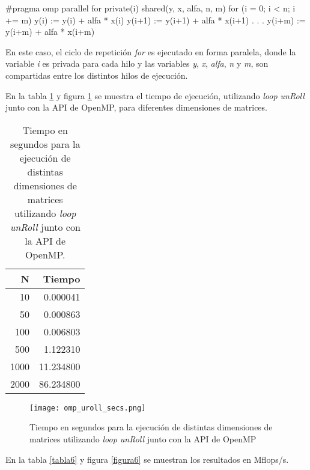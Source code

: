 \documentclass[a4paper,11pt]{article}
\begin{document}
\begin{verbatimtab}

#pragma omp parallel for private(i) shared(y, x, alfa, n, m)
for (i = 0; i < n; i += m)
{
	y(i) := y(i) + alfa * x(i)
	y(i+1) := y(i+1) + alfa * x(i+1)
		.
		.
		.
	y(i+m) := y(i+m) + alfa * x(i+m)
}
\end{verbatimtab}

En este caso, el ciclo de repetici\'on \emph{for} es ejecutado en forma paralela, donde la variable \emph{i} es privada para cada hilo y las variables \emph{y}, \emph{x}, \emph{alfa}, \emph{n} y \emph{m}, son compartidas entre los distintos hilos de ejecuci\'on.

En la tabla \ref{tabla5} y figura \ref{figura5} se muestra el tiempo de ejecuci\'on, utilizando \emph{loop unRoll} junto con la API de OpenMP, para diferentes dimensiones de matrices.

\begin{table}
\begin{center}
\begin{tabular}{|r|r|}
\hline
         N & Tiempo \\
\hline
        10 &   0.000041 \\
\hline
        50 &   0.000863 \\
\hline
       100 &   0.006803 \\
\hline
       500 &   1.122310 \\
\hline
      1000 &   11.234800 \\
\hline
      2000 &   86.234800 \\
\hline
\end{tabular}
\caption{Tiempo en segundos para la ejecuci\'on de distintas dimensiones de matrices utilizando \emph{loop unRoll} junto con la API de OpenMP.}\label{tabla5}
\end{center}
\end{table}

\begin{figure}
\centering
\texttt{[image: omp\_uroll\_secs.png]}
\caption{Tiempo en segundos para la ejecuci\'on de distintas dimensiones de matrices utilizando \emph{loop unRoll} junto con la API de OpenMP}\label{figura5}
\end{figure}

En la tabla \ref{tabla6} y figura \ref{figura6} se muestran los resultados en Mflops/s.
\end{document}
